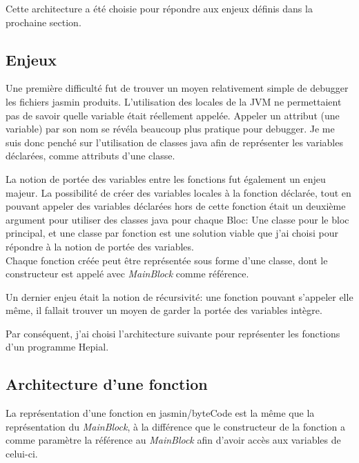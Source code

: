 \documentclass[11pt,a4paper]{article}
\begin{document}
  \par Cette architecture a été choisie pour répondre aux enjeux définis dans la prochaine section. 
  
  \subsection{Enjeux}
  
  \par Une première difficulté fut de trouver un moyen relativement simple de debugger les fichiers jasmin produits. L'utilisation des locales de la JVM ne permettaient pas de savoir quelle variable était réellement appelée. Appeler un attribut (une variable) par son nom se révéla beaucoup plus pratique pour debugger. Je me suis donc penché sur l'utilisation de classes java afin de représenter les variables déclarées, comme attributs d'une classe. 
  
  \par La notion de portée des variables entre les fonctions fut également un enjeu majeur. La possibilité de créer des variables locales à la fonction déclarée, tout en pouvant appeler des variables déclarées hors de cette fonction était un deuxième argument pour utiliser des classes java pour chaque Bloc: Une classe pour le bloc principal, et une classe par fonction est une solution viable que j'ai choisi pour répondre à la notion de portée des variables. \\
  Chaque fonction créée peut être représentée sous forme d'une classe, dont le constructeur est appelé avec \textit{MainBlock} comme référence. 
  
  \par Un dernier enjeu était la notion de récursivité: une fonction pouvant s'appeler elle même, il fallait trouver un moyen de garder la portée des variables intègre. 
  
  \par Par conséquent, j'ai choisi l'architecture suivante pour représenter les fonctions d'un programme Hepial.  
  
  \subsection{Architecture d'une fonction}
  
  \par La représentation d'une fonction en jasmin/byteCode est la même que la représentation du \textit{MainBlock}, à la différence que le constructeur de la fonction a comme paramètre la référence au \textit{MainBlock} afin d'avoir accès aux variables de celui-ci. 
  
\end{document}
